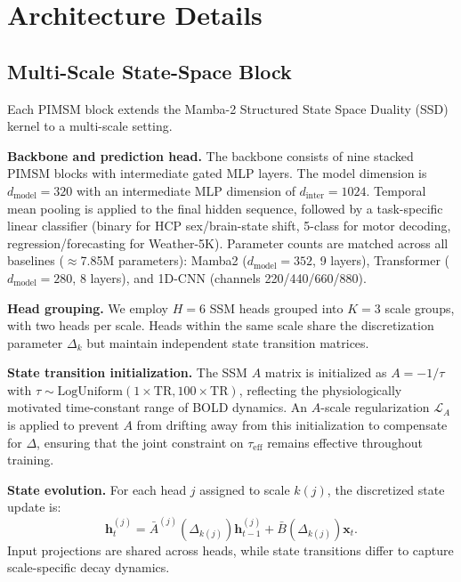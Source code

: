 \documentclass{article}
\begin{document}
\section{Architecture Details}
\label{sec:appx:arch_details}

\subsection{Multi-Scale State-Space Block}

Each PIMSM block extends the Mamba-2 Structured State Space Duality (SSD) kernel to a multi-scale setting.

\textbf{Backbone and prediction head.} The backbone consists of nine stacked PIMSM blocks with intermediate gated MLP layers. The model dimension is $d_{\mathrm{model}} = 320$ with an intermediate MLP dimension of $d_{\mathrm{inter}} = 1024$. Temporal mean pooling is applied to the final hidden sequence, followed by a task-specific linear classifier (binary for HCP sex/brain-state shift, 5-class for motor decoding, regression/forecasting for Weather-5K). Parameter counts are matched across all baselines ($\approx$7.85M parameters): Mamba2 ($d_{\mathrm{model}}=352$, 9 layers), Transformer ($d_{\mathrm{model}}=280$, 8 layers), and 1D-CNN (channels 220/440/660/880).

\textbf{Head grouping.} We employ $H = 6$ SSM heads grouped into $K = 3$ scale groups, with two heads per scale. Heads within the same scale share the discretization parameter $\Delta_k$ but maintain independent state transition matrices.

\textbf{State transition initialization.} The SSM $A$ matrix is initialized as $A = -1/\tau$ with $\tau \sim \mathrm{LogUniform}(1 \times \mathrm{TR}, 100 \times \mathrm{TR})$, reflecting the physiologically motivated time-constant range of BOLD dynamics. An $A$-scale regularization $\mathcal{L}_A$ is applied to prevent $A$ from drifting away from this initialization to compensate for $\Delta$, ensuring that the joint constraint on $\tau_\text{eff}$ remains effective throughout training.

\textbf{State evolution.} For each head $j$ assigned to scale $k(j)$, the discretized state update is:
\begin{equation}
\mathbf{h}^{(j)}_t = \bar{A}^{(j)}(\Delta_{k(j)}) \mathbf{h}^{(j)}_{t-1} + \bar{B}(\Delta_{k(j)}) \mathbf{x}_t.
\end{equation}
Input projections are shared across heads, while state transitions differ to capture scale-specific decay dynamics.
\end{document}
